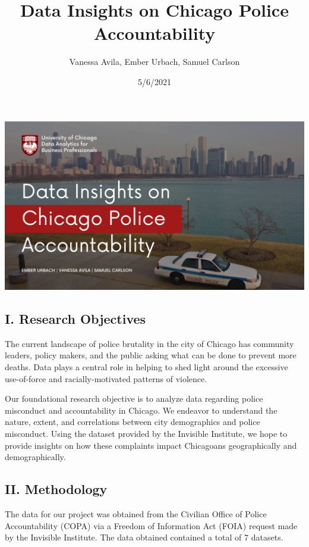 \documentclass[
]{article}
\title{Data Insights on Chicago Police Accountability}
\author{Vanessa Avila, Ember Urbach, Samuel Carlson}
\date{5/6/2021}
\begin{document}
\maketitle

{
\setcounter{tocdepth}{2}
\tableofcontents
}
\includegraphics{Title.png}

\hypertarget{i.-research-objectives}{%
\subsection{I. Research Objectives}\label{i.-research-objectives}}

The current landscape of police brutality in the city of Chicago has
community leaders, policy makers, and the public asking what can be done
to prevent more deaths. Data plays a central role in helping to shed
light around the excessive use-of-force and racially-motivated patterns
of violence.

Our foundational research objective is to analyze data regarding police
misconduct and accountability in Chicago. We endeavor to understand the
nature, extent, and correlations between city demographics and police
misconduct. Using the dataset provided by the Invisible Institute, we
hope to provide insights on how these complaints impact Chicagoans
geographically and demographically.

\hypertarget{ii.-methodology}{%
\subsection{II. Methodology}\label{ii.-methodology}}

The data for our project was obtained from the Civilian Office of Police
Accountability (COPA) via a Freedom of Information Act (FOIA) request
made by the Invisible Institute. The data obtained contained a total of
7 datasets.
\end{document}
